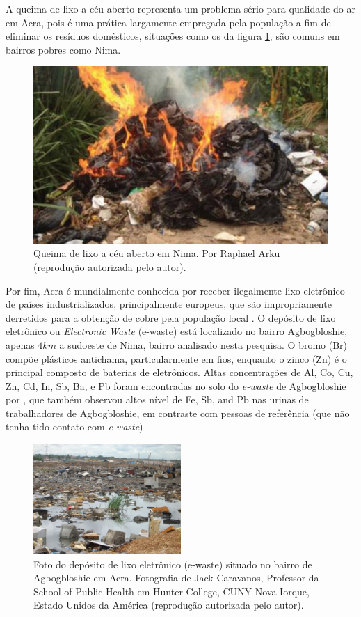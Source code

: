 A queima de lixo a céu aberto representa um problema sério para qualidade do
ar em Acra, pois é uma prática largamente empregada pela população a fim de 
eliminar os resíduos domésticos, situações como os da figura \ref{fig:nima_lixo}, 
são comuns em bairros pobres como Nima.  

\begin{figure}[H]
  \centering
    \includegraphics[width=0.5\linewidth]{../inputs/images/zheng/arku3.jpeg}
    \caption{Queima de lixo a céu aberto em Nima. Por Raphael Arku 
           (reprodução autorizada pelo autor).\label{fig:nima_lixo}}
\end{figure} 

Por fim, Acra é mundialmente conhecida por receber ilegalmente lixo 
eletrônico de países industrializados, principalmente europeus, 
que são impropriamente derretidos para a obtenção de cobre pela população local
\citep{asampong2015}. 
O depósito de lixo eletrônico ou \textit{Electronic Waste} (e-waste) está 
localizado no bairro Agbogbloshie, apenas $4 km$ a sudoeste de 
Nima, bairro analisado nesta pesquisa. 
O bromo (Br) compõe plásticos antichama, particularmente em fios, enquanto o 
zinco (Zn) é o principal composto de baterias de eletrônicos. 
Altas concentrações de Al, Co, Cu, Zn, Cd, In, Sb, Ba, e Pb foram encontradas 
no solo do \textit{e-waste} de Agbogbloshie por \citet{asante2012}, 
que também observou altos nível de Fe, Sb, and Pb nas urinas de trabalhadores 
de Agbogbloshie, em contraste com pessoas de referência
(que não tenha tido contato com \textit{e-waste})

\begin{figure}[H]
  \centering
  \includegraphics[width=0.5\textwidth]{../inputs/images/ewaste_jack_caravano.jpg}
  \caption{Foto do depósito de lixo eletrônico (e-waste) situado no bairro 
           de Agbogbloshie em Acra. Fotografia de Jack Caravanos, 
           Professor da School of Public Health em Hunter College, CUNY
           Nova Iorque, Estado Unidos da América 
           (reprodução autorizada pelo autor). \label{fig:ewaste}}
\end{figure}

